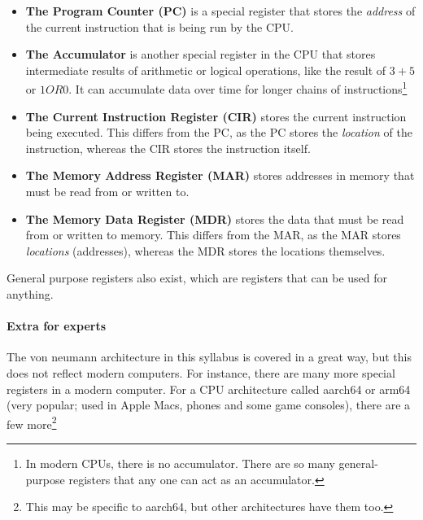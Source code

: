 \documentclass[../main.tex]{subfiles}
\begin{document}
\begin{itemize}
    \item \textbf{The Program Counter (PC)} is a special register that stores the \emph{address} of the current instruction that is being run by the CPU.
    \item \textbf{The Accumulator} is another special register in the CPU that stores intermediate results of arithmetic or logical operations, like the result of $3+5$ or $1 OR 0$. It can accumulate data over time for longer chains of instructions\footnote{In modern CPUs, there is no accumulator. There are so many general-purpose registers that any one can act as an accumulator.}
    \item \textbf{The Current Instruction Register (CIR)} stores the current instruction being executed. This differs from the PC, as the PC stores the \emph{location} of the instruction, whereas the CIR stores the instruction itself.
    \item \textbf{The Memory Address Register (MAR)} stores addresses in memory that must be read from or written to.
    \item \textbf{The Memory Data Register (MDR)} stores the data that must be read from or written to memory. This differs from the MAR, as the MAR stores \emph{locations} (addresses), whereas the MDR stores the locations themselves.
\end{itemize}

General purpose registers also exist, which are registers that can be used for anything.

\paragraph{Extra for experts}

The von neumann architecture in this syllabus is covered in a great way, but this does not reflect modern computers. For instance, there are many more special registers in a modern computer. For a CPU architecture called {\ccmono aarch64} or {\ccmono arm64} (very popular; used in Apple Macs, phones and some game consoles), there are a few more\footnote{This may be specific to aarch64, but other architectures have them too.}
\end{document}
